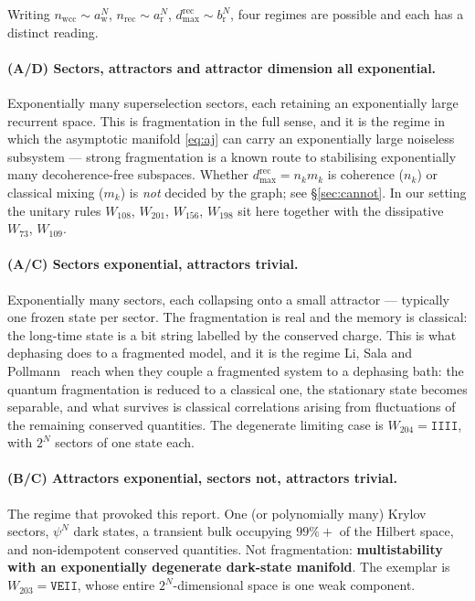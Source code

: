 \documentclass[11pt]{article}
\newcommand{\rt}[1]{\texttt{#1}}
\theoremstyle{plain}
\theoremstyle{definition}
\theoremstyle{remark}
\begin{document}
Writing $n_{\mathrm{wcc}} \sim a_{\mathrm{w}}^N$,
$n_{\mathrm{rec}} \sim a_{\mathrm{r}}^N$,
$d^{\mathrm{rec}}_{\max} \sim b_{\mathrm{r}}^N$, four regimes are possible and
each has a distinct reading.

\paragraph{(A/D) Sectors, attractors and attractor dimension all exponential.}
Exponentially many superselection sectors, each retaining an exponentially
large recurrent space. This is fragmentation in the full sense, and it is the
regime in which the asymptotic manifold \eqref{eq:aj} can carry an
exponentially large noiseless subsystem --- strong fragmentation is a known
route to stabilising exponentially many decoherence-free subspaces. Whether
$d^{\mathrm{rec}}_{\max} = n_k m_k$ is coherence ($n_k$) or classical mixing
($m_k$) is \emph{not} decided by the graph; see \S\ref{sec:cannot}. In our
setting the unitary rules $W_{108}$, $W_{201}$, $W_{156}$, $W_{198}$ sit here
together with the dissipative $W_{73}$, $W_{109}$.

\paragraph{(A/C) Sectors exponential, attractors trivial.} Exponentially many
sectors, each collapsing onto a small attractor --- typically one frozen
state per sector. The fragmentation is real and the memory is classical: the
long-time state is a bit string labelled by the conserved charge. This is what
dephasing does to a fragmented model, and it is the regime Li, Sala and
Pollmann~\cite{li2023} reach when they couple a fragmented system to a
dephasing bath: the quantum fragmentation is reduced to a classical one, the
stationary state becomes separable, and what survives is classical
correlations arising from fluctuations of the remaining conserved quantities.
The degenerate limiting case is $W_{204} = \rt{IIII}$, with $2^N$ sectors of
one state each.

\paragraph{(B/C) Attractors exponential, sectors not, attractors trivial.}
The regime that provoked this report. One (or polynomially many) Krylov
sectors, $\psi^N$ dark states, a transient bulk occupying $99\%+$ of the
Hilbert space, and non-idempotent conserved quantities. Not fragmentation:
\textbf{multistability with an exponentially degenerate dark-state manifold}.
The exemplar is $W_{203} = \rt{VEII}$, whose entire $2^N$-dimensional space is
one weak component.
\end{document}
